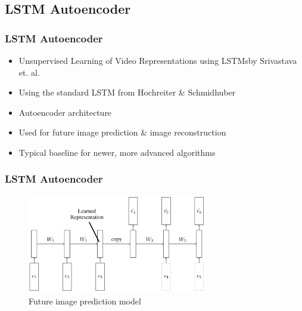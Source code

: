  \subsection{LSTM Autoencoder}
  \begin{frame}
   \frametitle{LSTM Autoencoder}
   
   \begin{itemize}
    \item<1-> \glqq Unsupervised Learning of Video Representations using LSTMs\grqq by Srivastava et. al. \cite{Srivastava2015}
    \item<2-> Using the standard LSTM from Hochreiter \& Schmidhuber \cite{Hochreiter1997}
    \item<3-> Autoencoder architecture
    \item<4-> Used for future image prediction \& image reconstruction
    \item<5-> Typical baseline for newer, more advanced algorithms
   \end{itemize}
   
  \end{frame}
  \begin{frame}
   \frametitle{LSTM Autoencoder}
   
   \begin{figure}[H]
    \includegraphics[width=0.7\textwidth]{../Images/srivastava.png}
    \centering
    \caption{Future image prediction model \citep{Srivastava2015}}
    \label{fig:lstm_architecture}
   \end{figure}
  
  \end{frame}
